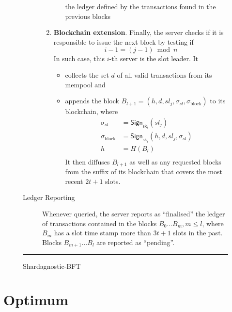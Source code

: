 \begin{figure}
\begin{description}
\begin{enumerate}
\begin{enumerate}
    the ledger defined by the transactions found in the previous blocks
  \end{enumerate}
%
  \item \textbf{Blockchain extension}.\label{bft:extension} Finally, the server
  checks if it is responsible to issue the next block by testing if
%
  \begin{equation}
    i - 1 = (j - 1) \bmod n
  \label{bft:leadershipcheck}
  \end{equation}
%
  In such case, this $i$-th server is the slot leader. It
%
  \begin{itemize}
    \item collects the set $d$ of all valid transactions from its mempool and
    \item appends the block $B_{l+1} = (h, d, \mathit{sl}_j, \sigma_\mathit{sl}, \sigma_\mathrm{block})$ to its blockchain, where
    \begin{equation*}
      \begin{split}
      \sigma_\mathit{sl}    & = \mathsf{Sign}_{\mathsf{sk}_i}(\mathit{sl}_j) \\
      \sigma_\mathrm{block} & = \mathsf{Sign}_{\mathsf{sk}_i}(h, d, \mathit{sl}_j, \sigma_\mathit{sl}) \\
      h                     & = H(B_l) \\
      \end{split}
    \end{equation*}
    It then diffuses $B_{l+1}$ as well as any requested blocks from the suffix of its blockchain that covers the most recent $2t + 1$ slots.
    \end{itemize}

  \end{enumerate}

  \item[Ledger Reporting] Whenever queried, the server reports as ``finalised'' the ledger of transactions contained in the blocks $B_0 \ldots B_m, m \le l$, where $B_m$ has a slot time stamp more than $3t + 1$ slots in the past. Blocks $B_{m+1} \ldots B_l$ are reported as ``pending''.
\end{description}

\hrule
\caption{\label{figure:bft}Shardagnostic-BFT \cite[Figure 1]{cryptoeprint:2018:1049}}
\end{figure}

\section{Optimum}
\label{optimum}

